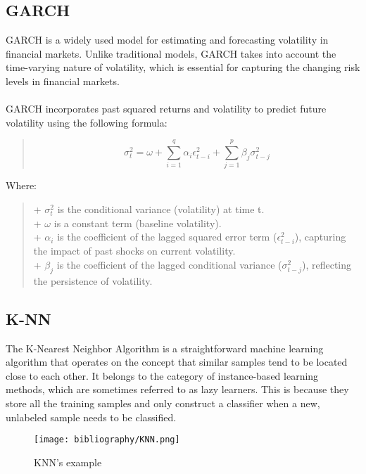 \documentclass{ieeeojies}
\begin{document}
\subsection{GARCH}
GARCH is a widely used model for estimating and forecasting volatility in financial markets. Unlike traditional models, GARCH takes into account the time-varying nature of volatility, which is essential for capturing the changing risk levels in financial markets.\\
\vspace{1pt}\\
GARCH incorporates past squared returns and volatility to predict future volatility using the following formula:
\begin{quote}
\[\sigma_t^2 = \omega + \sum_{i=1}^{q}\alpha_i\epsilon_{t-i}^2 + \sum_{j=1}^{p}\beta_j\sigma_{t-j}^2
\]
\end{quote}
Where:
\begin{quote}
   + $\sigma_t^2$ is the conditional variance (volatility) at time t.\\
   + $\omega$ is a constant term (baseline volatility).\\
   + $\alpha_i$ is the coefficient of the lagged squared error term ($\epsilon_{t-i}^2$), capturing the impact of past shocks on current volatility.\\
   + $\beta_j$ is the coefficient of the lagged conditional variance ($\sigma_{t-j}^2$), reflecting the persistence of volatility.

\end{quote}

\subsection{K-NN}
The K-Nearest Neighbor Algorithm is a straightforward machine learning algorithm that operates on the concept that similar samples tend to be located close to each other. It belongs to the category of instance-based learning methods, which are sometimes referred to as lazy learners. This is because they store all the training samples and only construct a classifier when a new, unlabeled sample needs to be classified.
\begin{figure}[H]
  \centering
  \begin{minipage}{1\linewidth}
    \centering
    \texttt{[image: bibliography/KNN.png]}
    \caption{KNN's example}
    \label{fig:3}
  \end{minipage}
\end{figure}
\end{document}
